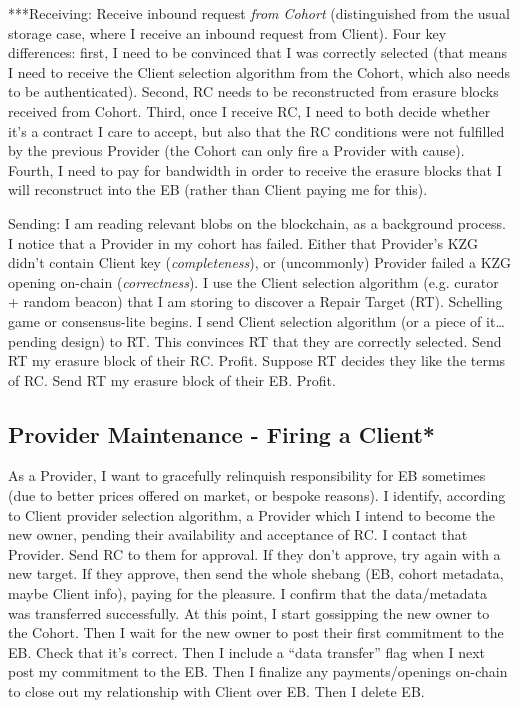 \documentclass{article}
\begin{document}
***Receiving: Receive inbound request \textit{from Cohort} (distinguished from the usual storage case, where I receive an inbound request from Client). Four key differences: first, I need to be convinced that I was correctly selected (that means I need to receive the Client selection algorithm from the Cohort, which also needs to be authenticated). Second, RC needs to be reconstructed from erasure blocks received from Cohort. Third, once I receive RC, I need to both decide whether it’s a contract I care to accept, but also that the RC conditions were not fulfilled by the previous Provider (the Cohort can only fire a Provider with cause). Fourth, I need to pay for bandwidth in order to receive the erasure blocks that I will reconstruct into the EB (rather than Client paying me for this).

Sending: I am reading relevant blobs on the blockchain, as a background process. I notice that a Provider in my cohort has failed. Either that Provider’s KZG didn’t contain Client key (\textit{completeness}), or (uncommonly) Provider failed a KZG opening on-chain (\textit{correctness}). I use the Client selection algorithm (e.g. curator + random beacon) that I am storing to discover a Repair Target (RT). Schelling game or consensus-lite begins. I send Client selection algorithm (or a piece of it… pending design) to RT. This convinces RT that they are correctly selected. Send RT my erasure block of their RC. Profit. Suppose RT decides they like the terms of RC. Send RT my erasure block of their EB. Profit.

\subsection{Provider Maintenance - Firing a Client*}

As a Provider, I want to gracefully relinquish responsibility for EB sometimes (due to better prices offered on market, or bespoke reasons). I identify, according to Client provider selection algorithm, a Provider which I intend to become the new owner, pending their availability and acceptance of RC. I contact that Provider. Send RC to them for approval. If they don’t approve, try again with a new target. If they approve, then send the whole shebang (EB, cohort metadata, maybe Client info), paying for the pleasure. I confirm that the data/metadata was transferred successfully. At this point, I start gossipping the new owner to the Cohort. Then I wait for the new owner to post their first commitment to the EB. Check that it’s correct. Then I include a “data transfer” flag when I next post my commitment to the EB. Then I finalize any payments/openings on-chain to close out my relationship with Client over EB. Then I delete EB.
\end{document}
